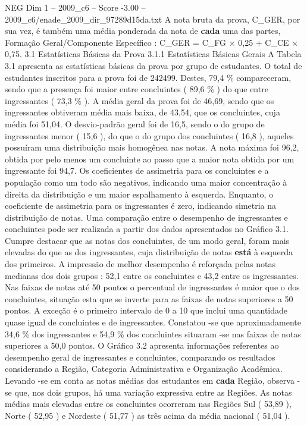 \begin{textsample}{NEG Dim 1 – 2009\_c6 – Score -3.00 – 2009\_c6/enade\_2009\_dir\_97289d15da.txt}
A nota bruta da prova, C\_GER, por sua vez, é também uma média ponderada da nota de \textbf{cada} uma das partes, Formação Geral/Componente Específico : C\_GER = C\_FG × 0,25 + C\_CE × 0,75. 3.1 Estatísticas Básicas da Prova 3.1.1 Estatísticas Básicas Gerais A Tabela 3.1 apresenta as estatísticas básicas da prova por grupo de estudantes.
O total de estudantes inscritos para a prova foi de 242499.
Destes, 79,4 \% compareceram, sendo que a presença foi maior entre concluintes ( 89,6 \% ) do que entre ingressantes ( 73,3 \% ).
A média geral da prova foi de 46,69, sendo que os ingressantes obtiveram média mais baixa, de 43,54, que os concluintes, cuja média foi 51,04.
O desvio-padrão geral foi de 16,5, sendo o do grupo de ingressantes menor ( 15,6 ), do que o do grupo dos concluintes ( 16,8 ), aqueles possuíram uma distribuição mais homogênea nas notas.
A nota máxima foi 96,2, obtida por pelo menos um concluinte ao passo que a maior nota obtida por um ingressante foi 94,7.
Os coeficientes de assimetria para os concluintes e a população como um todo são negativos, indicando uma maior concentração à direita da distribuição e um maior espalhamento à esquerda.
Enquanto, o coeficiente de assimetria para os ingressantes é zero, indicando simetria na distribuição de notas.
Uma comparação entre o desempenho de ingressantes e concluintes pode ser realizada a partir dos dados apresentados no Gráfico 3.1.
Cumpre destacar que as notas dos concluintes, de um modo geral, foram mais elevadas do que as dos ingressantes, cuja distribuição de notas \textbf{está} à esquerda dos primeiros.
A impressão de melhor desempenho é reforçada pelas notas medianas dos dois grupos : 52,1 entre os concluintes e 43,2 entre os ingressantes.
Nas faixas de notas até 50 pontos o percentual de ingressantes é maior que o dos concluintes, situação esta que se inverte para as faixas de notas superiores a 50 pontos.
A exceção é o primeiro intervalo de 0 a 10 que inclui uma quantidade quase igual de concluintes e de ingressantes.
Constatou -se que aproximadamente 34,6 \% dos ingressantes e 54,9 \% dos concluintes situaram -se nas faixas de notas superiores a 50,0 pontos.
O Gráfico 3.2 apresenta informações referentes ao desempenho geral de ingressantes e concluintes, comparando os resultados considerando a Região, Categoria Administrativa e Organização Acadêmica.
Levando -se em conta as notas médias dos estudantes em \textbf{cada} Região, observa -se que, nos dois grupos, há uma variação expressiva entre as Regiões.
As notas médias mais elevadas entre os concluintes ocorreram nas Regiões Sul ( 53,89 ), Norte ( 52,95 ) e Nordeste ( 51,77 ) as três acima da média nacional ( 51,04 ).

\end{textsample}
